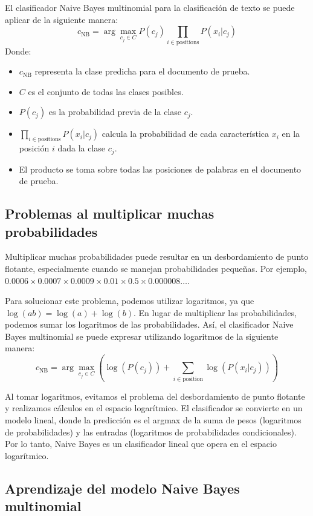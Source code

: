 \documentclass[11pt,fleqn]{book} %
\begin{document}
El clasificador Naive Bayes multinomial para la clasificación de texto se puede aplicar de la siguiente manera:
\[
c_{\text{NB}} = \arg\max_{c_j \in C} P(c_j) \prod_{i \in \text{positions}} P(x_i | c_j)
\]
Donde:
\begin{itemize}
    \item $c_{\text{NB}}$ representa la clase predicha para el documento de prueba.
    \item $C$ es el conjunto de todas las clases posibles.
    \item $P(c_j)$ es la probabilidad previa de la clase $c_j$.
    \item $\prod_{i \in \text{positions}} P(x_i | c_j)$ calcula la probabilidad de cada característica $x_i$ en la posición $i$ dada la clase $c_j$.
    \item El producto se toma sobre todas las posiciones de palabras en el documento de prueba.
\end{itemize}

\subsection{Problemas al multiplicar muchas probabilidades}

Multiplicar muchas probabilidades puede resultar en un desbordamiento de punto flotante, especialmente cuando se manejan probabilidades pequeñas. Por ejemplo, $0.0006 \times 0.0007 \times 0.0009 \times 0.01 \times 0.5 \times 0.000008 \ldots$.

Para solucionar este problema, podemos utilizar logaritmos, ya que $\log(ab) = \log(a) + \log(b)$. En lugar de multiplicar las probabilidades, podemos sumar los logaritmos de las probabilidades. Así, el clasificador Naive Bayes multinomial se puede expresar utilizando logaritmos de la siguiente manera:
\[
c_{\text{NB}} = \arg\max_{c_j \in C} \left(\log(P(c_j)) + \sum_{i \in \text{position}} \log(P(x_i | c_j))\right)
\]

Al tomar logaritmos, evitamos el problema del desbordamiento de punto flotante y realizamos cálculos en el espacio logarítmico. El clasificador se convierte en un modelo lineal, donde la predicción es el argmax de la suma de pesos (logaritmos de probabilidades) y las entradas (logaritmos de probabilidades condicionales). Por lo tanto, Naive Bayes es un clasificador lineal que opera en el espacio logarítmico.

\subsection{Aprendizaje del modelo Naive Bayes multinomial}
\end{document}
